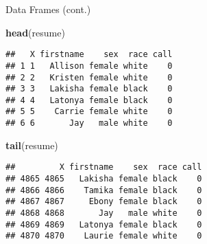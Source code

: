 \documentclass[ignorenonframetext,]{beamer}
\newenvironment{Shaded}{\begin{snugshade}}{\end{snugshade}}
\newcommand{\KeywordTok}[1]{\textcolor[rgb]{0.13,0.29,0.53}{\textbf{#1}}}
\newcommand{\NormalTok}[1]{#1}
\begin{document}
\begin{frame}[fragile]{Data Frames (cont.)}

\begin{Shaded}
\begin{Highlighting}[]
\KeywordTok{head}\NormalTok{(resume)}
\end{Highlighting}
\end{Shaded}

\begin{verbatim}
##   X firstname    sex  race call
## 1 1   Allison female white    0
## 2 2   Kristen female white    0
## 3 3   Lakisha female black    0
## 4 4   Latonya female black    0
## 5 5    Carrie female white    0
## 6 6       Jay   male white    0
\end{verbatim}

\begin{Shaded}
\begin{Highlighting}[]
\KeywordTok{tail}\NormalTok{(resume)}
\end{Highlighting}
\end{Shaded}

\begin{verbatim}
##         X firstname    sex  race call
## 4865 4865   Lakisha female black    0
## 4866 4866    Tamika female black    0
## 4867 4867     Ebony female black    0
## 4868 4868       Jay   male white    0
## 4869 4869   Latonya female black    0
## 4870 4870    Laurie female white    0
\end{verbatim}

\end{frame}
\end{document}
